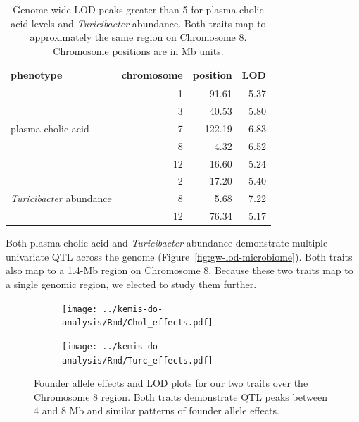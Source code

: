 \documentclass[oneside]{book}\usepackage[]{graphicx}\usepackage[]{color}
\begin{document}
\begin{table}[ht]
\centering
\begin{tabular}{lrrr}
  \hline
phenotype & chromosome & position & LOD \\ 
  \hline
\multirow{5}{*}{plasma cholic acid} &   1 & 91.61 & 5.37 \\ 
   &   3 & 40.53 & 5.80 \\ 
   &   7 & 122.19 & 6.83 \\ 
       
&   \cellcolor{LightCyan}8 & \cellcolor{LightCyan}4.32 & \cellcolor{LightCyan}6.52 \\ 
   &  12 & 16.60 & 5.24 \\ 
   \hline
 \multirow{3}{*}{\emph{Turicibacter} abundance} &   2 & 17.20 & 5.40 \\ 
  &   \cellcolor{LightCyan}8 & \cellcolor{LightCyan}5.68 & \cellcolor{LightCyan}7.22 \\ 
  &  12 & 76.34 & 5.17 \\ 
   \hline
\end{tabular}
\caption{\label{tab:3c-lod-peaks}Genome-wide LOD peaks greater than 5 for plasma cholic acid levels and \emph{Turicibacter} abundance. Both traits map to approximately the same region on Chromosome 8. Chromosome positions are in Mb units.}
\end{table}

Both plasma cholic acid and \emph{Turicibacter} abundance demonstrate multiple univariate QTL across the genome (Figure~\ref{fig:gw-lod-microbiome}). Both traits also map to a 1.4-Mb region on Chromosome 8. Because these two traits map to a single genomic region, we elected to study them further. 



\begin{figure}
\begin{subfigure}[b]{\textwidth}
\centering
\texttt{[image: ../kemis-do-analysis/Rmd/Chol\_effects.pdf]}
\end{subfigure}

\begin{subfigure}[b]{\textwidth}
\centering
\texttt{[image: ../kemis-do-analysis/Rmd/Turc\_effects.pdf]}
\end{subfigure}
\caption{Founder allele effects and LOD plots for our two traits over the Chromosome 8 region. Both traits demonstrate QTL peaks between 4 and 8 Mb and similar patterns of founder allele effects.}\label{fig:3c-effects}
\end{figure}
\end{document}
